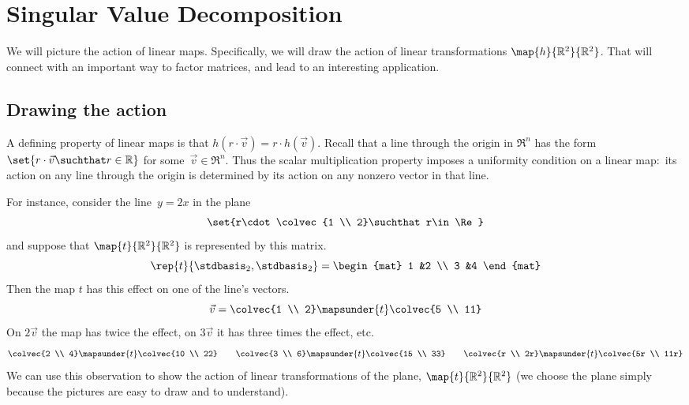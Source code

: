 \chapter{Singular Value Decomposition}
\label{chap:SingularValueDecomposition}

We will picture the action of linear maps.
Specifically, we will draw 
the action of linear transformations $\map{h}{\Re^2}{\Re^2}$.
That will connect with an important way to factor matrices, and lead to
an interesting application.


\section{Drawing the action}
A defining property of linear maps is that 
$h(r\cdot\vec{v})=r\cdot h(\vec{v})$.
Recall that a line through the origin in $\Re^n$ has the form 
$\set{r\cdot \vec{v}\suchthat r\in\Re}$ for some~$\vec{v}\in\Re^n$. 
Thus the scalar multiplication property  
imposes a uniformity condition on a linear map:~its action on any 
line through the origin is determined by its action
on any nonzero vector in that line.

For instance, consider the line~$y=2x$ in the plane
\begin{equation*}
  \set{r\cdot\colvec{1 \\ 2}\suchthat r\in\Re}
\end{equation*}
and suppose that $\map{t}{\Re^2}{\Re^2}$ is represented by this matrix.
\begin{equation*}
  \rep{t}{\stdbasis_2,\stdbasis_2}
  =
  \begin{mat}
    1 &2 \\
    3 &4
  \end{mat}
\end{equation*}
Then the map $t$ has this effect on one of the line's vectors.
\begin{equation*}
  \vec{v}=\colvec{1 \\ 2}\mapsunder{t}\colvec{5 \\ 11}
\end{equation*}
On $2\vec{v}$ the 
map has twice the effect, on  $3\vec{v}$ it has three times the
effect, etc.
\begin{equation*}
  \colvec{2 \\ 4}\mapsunder{t}\colvec{10 \\ 22}
  \qquad
  \colvec{3 \\ 6}\mapsunder{t}\colvec{15 \\ 33}
  \qquad
  \colvec{r \\ 2r}\mapsunder{t}\colvec{5r \\ 11r}
\end{equation*}
We can use this observation to show the action of 
linear transformations of the plane, $\map{t}{\Re^2}{\Re^2}$
(we choose the plane simply because the pictures are 
easy to draw and to understand). 

